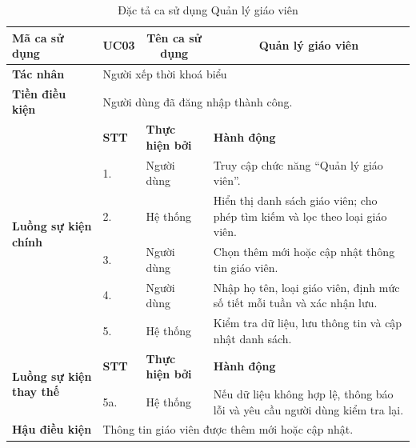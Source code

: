 \documentclass[../DoAn.tex]{subfiles}
\begin{document}
\begin{longtable}{|p{2.8cm}|p{1cm}|p{2.8cm}|p{6.3cm}|}
\caption{Đặc tả ca sử dụng Quản lý giáo viên}
\label{tab:app_uc_quan_ly_giao_vien} \\
\hline
\multicolumn{1}{|l|}{\textbf{Mã ca sử dụng}} & \multicolumn{1}{c|}{UC03} &
\multicolumn{1}{c|}{\textbf{Tên ca sử dụng}} & \multicolumn{1}{c|}{Quản lý giáo viên} \\
\hline
\multicolumn{1}{|l|}{\textbf{Tác nhân}} & \multicolumn{3}{l|}{Người xếp thời khoá biểu} \\
\hline
\multicolumn{1}{|l|}{\textbf{Tiền điều kiện}} & \multicolumn{3}{l|}{Người dùng đã đăng nhập thành công.} \\
\hline
\multirow{6}{2.8cm}{\textbf{Luồng sự kiện chính}} & \textbf{STT} & \textbf{Thực hiện bởi} & \textbf{Hành động} \\
\cline{2-4}
& 1. & Người dùng & Truy cập chức năng ``Quản lý giáo viên''. \\
\cline{2-4}
& 2. & Hệ thống & Hiển thị danh sách giáo viên; cho phép tìm kiếm và lọc theo loại giáo viên. \\
\cline{2-4}
& 3. & Người dùng & Chọn thêm mới hoặc cập nhật thông tin giáo viên. \\
\cline{2-4}
& 4. & Người dùng & Nhập họ tên, loại giáo viên, định mức số tiết mỗi tuần và xác nhận lưu. \\
\cline{2-4}
& 5. & Hệ thống & Kiểm tra dữ liệu, lưu thông tin và cập nhật danh sách. \\
\hline
\multirow{2}{2.8cm}{\textbf{Luồng sự kiện thay thế}} & \textbf{STT} & \textbf{Thực hiện bởi} & \textbf{Hành động} \\
\cline{2-4}
& 5a. & Hệ thống & Nếu dữ liệu không hợp lệ, thông báo lỗi và yêu cầu người dùng kiểm tra lại. \\
\hline
\multicolumn{1}{|l|}{\textbf{Hậu điều kiện}} & \multicolumn{3}{p{10.5cm}|}{Thông tin giáo viên được thêm mới hoặc cập nhật.} \\
\hline
\end{longtable}
\end{document}
